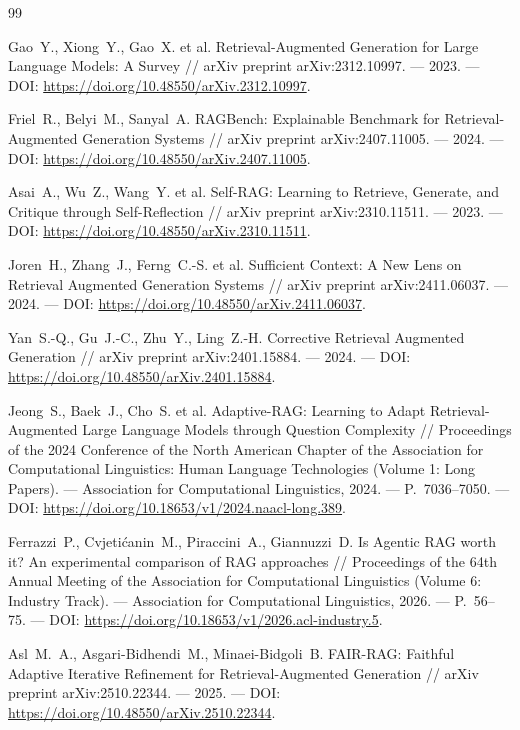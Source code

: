 \documentclass{misisarticle}
\begin{document}
\begin{thebibliography}{99}

 Gao~Y., Xiong~Y., Gao~X. et al. Retrieval-Augmented Generation for Large Language Models: A Survey // arXiv preprint arXiv:2312.10997. — 2023. — DOI: \url{https://doi.org/10.48550/arXiv.2312.10997}.

 Friel~R., Belyi~M., Sanyal~A. RAGBench: Explainable Benchmark for Retrieval-Augmented Generation Systems // arXiv preprint arXiv:2407.11005. — 2024. — DOI: \url{https://doi.org/10.48550/arXiv.2407.11005}.

 Asai~A., Wu~Z., Wang~Y. et al. Self-RAG: Learning to Retrieve, Generate, and Critique through Self-Reflection // arXiv preprint arXiv:2310.11511. — 2023. — DOI: \url{https://doi.org/10.48550/arXiv.2310.11511}.

 Joren~H., Zhang~J., Ferng~C.-S. et al. Sufficient Context: A New Lens on Retrieval Augmented Generation Systems // arXiv preprint arXiv:2411.06037. — 2024. — DOI: \url{https://doi.org/10.48550/arXiv.2411.06037}.

 Yan~S.-Q., Gu~J.-C., Zhu~Y., Ling~Z.-H. Corrective Retrieval Augmented Generation // arXiv preprint arXiv:2401.15884. — 2024. — DOI: \url{https://doi.org/10.48550/arXiv.2401.15884}.

 Jeong~S., Baek~J., Cho~S. et al. Adaptive-RAG: Learning to Adapt Retrieval-Augmented Large Language Models through Question Complexity // Proceedings of the 2024 Conference of the North American Chapter of the Association for Computational Linguistics: Human Language Technologies (Volume 1: Long Papers). — Association for Computational Linguistics, 2024. — P.~7036–7050. — DOI: \url{https://doi.org/10.18653/v1/2024.naacl-long.389}.

 Ferrazzi~P., Cvjetićanin~M., Piraccini~A., Giannuzzi~D. Is Agentic RAG worth it? An experimental comparison of RAG approaches // Proceedings of the 64th Annual Meeting of the Association for Computational Linguistics (Volume 6: Industry Track). — Association for Computational Linguistics, 2026. — P.~56–75. — DOI: \url{https://doi.org/10.18653/v1/2026.acl-industry.5}.

 Asl~M.~A., Asgari-Bidhendi~M., Minaei-Bidgoli~B. FAIR-RAG: Faithful Adaptive Iterative Refinement for Retrieval-Augmented Generation // arXiv preprint arXiv:2510.22344. — 2025. — DOI: \url{https://doi.org/10.48550/arXiv.2510.22344}.


\end{thebibliography}
\end{document}
